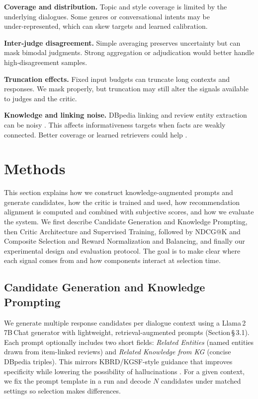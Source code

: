 \documentclass[12pt]{article}
\begin{document}
  \textbf{Coverage and distribution.} Topic and style coverage is limited by the underlying dialogues. Some genres or conversational intents may be under‑represented, which can skew targets and learned calibration.

  \textbf{Inter‑judge disagreement.} Simple averaging preserves uncertainty but can mask bimodal judgments. Strong aggregation or adjudication would better handle high‑disagreement samples.

  \textbf{Truncation effects.} Fixed input budgets can truncate long contexts and responses. We mask properly, but truncation may still alter the signals available to judges and the critic.

  \textbf{Knowledge and linking noise.} DBpedia linking and review entity extraction can be noisy \citep{dbpedia_wikipedia}. This affects informativeness targets when facts are weakly connected. Better coverage or learned retrievers could help \citep{lewis2020rag}.
  
  \section{Methods}
  This section explains how we construct knowledge‑augmented prompts and generate candidates, how the critic is trained and used, how recommendation alignment is computed and combined with subjective scores, and how we evaluate the system. We first describe Candidate Generation and Knowledge Prompting, then Critic Architecture and Supervised Training, followed by NDCG@K and Composite Selection and Reward Normalization and Balancing, and finally our experimental design and evaluation protocol. The goal is to make clear where each signal comes from and how components interact at selection time.
  \subsection{Candidate Generation and Knowledge Prompting}
  We generate multiple response candidates per dialogue context using a Llama\,2\,\textendash\,7B\,Chat generator with lightweight, retrieval-augmented prompts (Section\,\S\,3.1). Each prompt optionally includes two short fields: \emph{Related Entities} (named entities drawn from item-linked reviews) and \emph{Related Knowledge from KG} (concise DBpedia triples). This mirrors KBRD/KGSF-style guidance that improves specificity while lowering the possibility of hallucinations \citep{chen2020kbrd,zhou2020kgsf,lewis2020rag}. For a given context, we fix the prompt template in a run and decode $N$ candidates under matched settings so selection makes differences.
\end{document}
